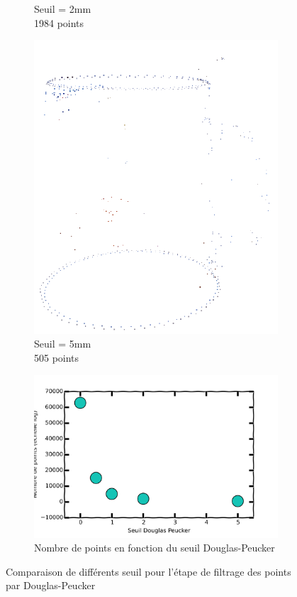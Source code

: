 \documentclass[a4paper,10pt]{report}
\begin{document}
\begin{figure}[h!]
\begin{subfigure}[b]{0.3\textwidth}
        \caption{Seuil = 2mm\\1984 points}
    \end{subfigure}
    \begin{subfigure}[b]{0.3\textwidth}
	    \includegraphics[width=\textwidth]{results/dp5-pointcloud.png}
        \caption{Seuil = 5mm\\505 points}
    \end{subfigure}
    \begin{subfigure}[b]{0.3\textwidth}
	    \includegraphics[width=\textwidth]{results/dp-points-graph.png}
        \caption{Nombre de points en fonction du seuil Douglas-Peucker}
    \end{subfigure}
    \caption{\label{fig:dpcmp}Comparaison de différents seuil pour l'étape de filtrage des points par Douglas-Peucker}
\end{figure}
\end{document}
